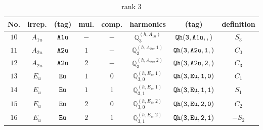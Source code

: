 \documentclass[fleqn,8pt]{jsarticle}
\begin{document}
\begin{table}[ht!]
\begin{center}
\caption{rank 3}
\renewcommand{\arraystretch}{1.3}
\begin{tabular}{cccccccc} \hline \hline
No. & irrep. & (tag) & mul. & comp. & harmonics & (tag) & definition \\ \hline
$ 10 $ & $ A_{1u} $ & $ {\tt A1u} $ & $ - $ & $ - $ & $ \mathbb{Q}_{3}^{(h,A_{1u})} $ & $ {\tt Qh(3,A1u,,)} $ & $ S_{3} $ \\
$ 11 $ & $ A_{2u} $ & $ {\tt A2u} $ & $ 1 $ & $ - $ & $ \mathbb{Q}_{3}^{(h,A_{2u},1)} $ & $ {\tt Qh(3,A2u,1,)} $ & $ C_{0} $ \\
$ 12 $ & $ A_{2u} $ & $ {\tt A2u} $ & $ 2 $ & $ - $ & $ \mathbb{Q}_{3}^{(h,A_{2u},2)} $ & $ {\tt Qh(3,A2u,2,)} $ & $ C_{3} $ \\
$ 13 $ & $ E_{u} $ & $ {\tt Eu} $ & $ 1 $ & $ 0 $ & $ \mathbb{Q}_{3,0}^{(h,E_{u},1)} $ & $ {\tt Qh(3,Eu,1,0)} $ & $ C_{1} $ \\
$ 14 $ & $ E_{u} $ & $ {\tt Eu} $ & $ 1 $ & $ 1 $ & $ \mathbb{Q}_{3,1}^{(h,E_{u},1)} $ & $ {\tt Qh(3,Eu,1,1)} $ & $ S_{1} $ \\
$ 15 $ & $ E_{u} $ & $ {\tt Eu} $ & $ 2 $ & $ 0 $ & $ \mathbb{Q}_{3,0}^{(h,E_{u},2)} $ & $ {\tt Qh(3,Eu,2,0)} $ & $ C_{2} $ \\
$ 16 $ & $ E_{u} $ & $ {\tt Eu} $ & $ 2 $ & $ 1 $ & $ \mathbb{Q}_{3,1}^{(h,E_{u},2)} $ & $ {\tt Qh(3,Eu,2,1)} $ & $ - S_{2} $ \\
 \hline \hline
\end{tabular}
\end{center}
\end{table}
\end{document}
